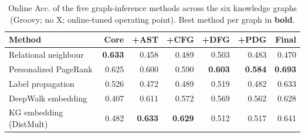 \begin{table}[H]
\centering \small
\caption{Online Acc. of the five graph-inference methods across the six knowledge graphs (Groovy; no X; online-tuned operating point). Best method per graph in \textbf{bold}.}
\label{tab:v4-final-acc}
\begin{tabular}{lrrrrrr}
\toprule
Method & Core & +AST & +CFG & +DFG & +PDG & Final \\
\midrule
Relational neighbour & \textbf{0.633} & 0.458 & 0.489 & 0.503 & 0.483 & 0.470 \\
Personalized PageRank & 0.625 & 0.600 & 0.590 & \textbf{0.603} & \textbf{0.584} & \textbf{0.693} \\
Label propagation & 0.526 & 0.472 & 0.489 & 0.519 & 0.482 & 0.633 \\
DeepWalk embedding & 0.407 & 0.611 & 0.572 & 0.569 & 0.562 & 0.628 \\
KG embedding (DistMult) & 0.482 & \textbf{0.633} & \textbf{0.629} & 0.512 & 0.517 & 0.641 \\
\bottomrule
\end{tabular}
\end{table}